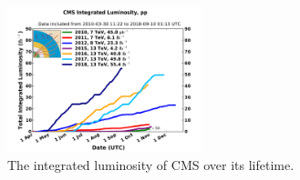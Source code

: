 \begin{figure}
\centering
\includegraphics[width=0.5\textwidth]{figs/int_lumi_cumulative_pp_2.pdf}
\caption{The integrated luminosity of CMS over its lifetime.}
\label{fig:lumi}
\end{figure}
